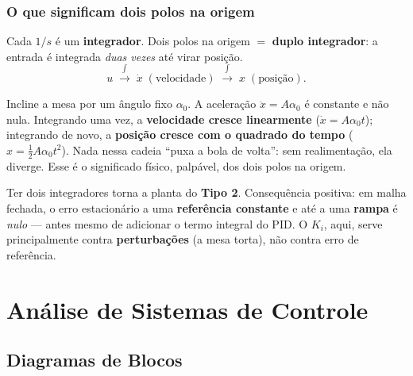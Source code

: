\section{O que significam dois polos na origem}
Cada $1/s$ \'e um \textbf{integrador}. Dois polos na origem $=$ \textbf{duplo
integrador}: a entrada \'e integrada \emph{duas vezes} at\'e virar posi\c{c}\~ao.
\begin{equation}
u \;\xrightarrow{\ \int\ }\; \dot{x}\;(\text{velocidade}) \;\xrightarrow{\ \int\ }\; x\;(\text{posi\c{c}\~ao}).
\end{equation}

\begin{intuicao}
Incline a mesa por um \^angulo fixo $\alpha_0$. A acelera\c{c}\~ao $\ddot x=A\alpha_0$
\'e constante e n\~ao nula. Integrando uma vez, a \textbf{velocidade cresce
linearmente} ($\dot x = A\alpha_0 t$); integrando de novo, a \textbf{posi\c{c}\~ao
cresce com o quadrado do tempo} ($x=\tfrac12 A\alpha_0 t^2$). Nada nessa cadeia
``puxa a bola de volta'': sem realimenta\c{c}\~ao, ela diverge. Esse \'e o
significado f\'isico, palp\'avel, dos dois polos na origem.
\end{intuicao}

\begin{conceito}
Ter dois integradores torna a planta do \textbf{Tipo 2}. Consequ\^encia
positiva: em malha fechada, o erro estacion\'ario a uma \textbf{refer\^encia
constante} e at\'e a uma \textbf{rampa} \'e \emph{nulo} --- antes mesmo de
adicionar o termo integral do PID. O $K_i$, aqui, serve principalmente contra
\textbf{perturba\c{c}\~oes} (a mesa torta), n\~ao contra erro de refer\^encia.
\end{conceito}

\part{An\'alise de Sistemas de Controle}

\chapter{Diagramas de Blocos}\label{cap:blocos}

